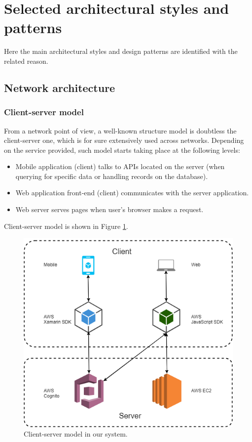 \section{Selected architectural styles and patterns}
\label{sec:archs}

Here the main architectural styles and design patterns are identified with the related reason.

\subsection*{Network architecture}
\subsubsection*{Client-server model}
From a network point of view, a well-known structure model is doubtless the client-server one, which is for sure extensively used across networks. Depending on the service provided, such model starts taking place at the following levels:
\begin{itemize}
\item Mobile application (client) talks to APIs located on the server (when querying for specific data or handling records on the database).
\item Web application front-end (client) communicates with the server application.
\item Web server serves pages when user's browser makes a request.
\end{itemize}

Client-server model is shown in Figure \ref{fig:clientserver}.

\begin{figure}
	\centering
	\includegraphics[width=6in]{./diagrams/ArchitectureDiagram.png}
	\caption{Client-server model in our system.}
	\label{fig:clientserver}
\end{figure}

